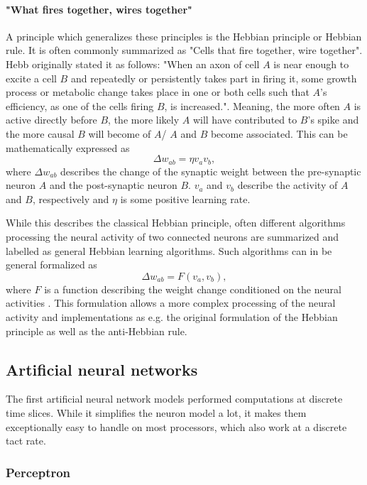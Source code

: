 \paragraph{"What fires together, wires together"} A principle which generalizes these principles is the Hebbian principle or Hebbian rule.
It is often commonly summarized as "Cells that fire together, wire together".
Hebb originally stated it as follows: "When an axon of cell $A$ is near enough to excite a cell $B$ and repeatedly or persistently takes part in firing it, some growth process or metabolic change takes place in one or both cells such that $A$'s efficiency, as one of the cells firing $B$, is increased."\cite{hebb19680}.
Meaning, the more often $A$ is active directly before $B$, the more likely $A$ will have contributed to $B$'s spike and the more causal $B$ will become of $A$/ $A$ and $B$ become associated.
This can be mathematically expressed as
\[
\Delta w_{ab} = \eta v_a v_b ,
\]
where $\Delta w_{ab}$ describes the change of the synaptic weight between the pre-synaptic neuron $A$ and the post-synaptic neuron $B$. 
$v_a$ and $v_b$ describe the activity of $A$ and $B$, respectively and $\eta$ is some positive learning rate. 

While this describes the classical Hebbian principle, often different algorithms processing the neural activity of two connected neurons are summarized and labelled as general Hebbian learning algorithms.
Such algorithms can in be general formalized as
\[
\Delta w_{ab} = F( v_a, v_b) , 
\]
where $F$ is a function describing the weight change conditioned on the neural activities \cite{gerstner2014neuronal}.     
This formulation allows a more complex processing of the neural activity and implementations as e.g. the original formulation of the Hebbian principle as well as the anti-Hebbian rule. 

\subsection{Artificial neural networks}

The first artificial neural network models performed computations at discrete time slices.
While it simplifies the neuron model a lot, it makes them exceptionally easy to handle on most processors, which also work at a discrete tact rate.

\subsubsection{Perceptron}

